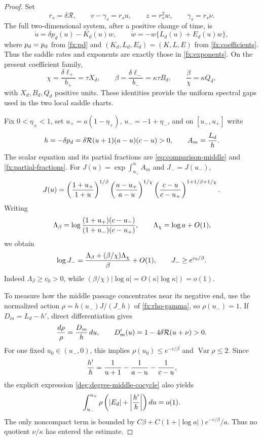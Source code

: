 \begin{proof}
Set
\[
 r_s=\delta\mathcal R,\qquad
 v-\gamma_s=r_su,\qquad z=r_s^2w,\qquad
 \gamma_s=r_s\nu .
\]
The full two-dimensional system, after a positive change of time, is
\begin{equation}
 \dot u=\delta p_d(u)-K_d(u)w,\qquad
 \dot w=-w\{L_d(u)+E_d(u)w\},
 \label{deg:degree-field}
\end{equation}
where \(p_d=p_{\rm d}\) from \eqref{fx:pd} and
\((K_d,L_d,E_d)=(K,L,E)\) from \eqref{fx:coefficients}.
Thus the saddle rates and exponents are exactly those in
\eqref{fx:exponents}. On the present coefficient family,
\begin{equation}
 \chi=\frac{\delta\ell_+}{b_+}=\tau X_d,\qquad
 \beta=\frac{\delta\ell_-}{b_-}=\kappa\tau B_d,\qquad
 \frac{\beta}{\chi}=\kappa Q_d,
 \label{deg:degree-exponents}
\end{equation}
with \(X_d,B_d,Q_d\) positive units.  These identities provide the
uniform spectral gaps used in the two local saddle charts.

Fix \(0<\eta_\pm<1\), set
\(u_+=a(1-\eta_+)\), \(u_-=-1+\eta_-\), and on
\([u_-,u_+]\) write
\[
 h=-\delta p_d
   =\delta\mathcal R(u+1)(a-u)(c-u)>0,\qquad
 A_m={L_d\over h}.
\]
The scalar equation and its partial fractions are
\eqref{eq:comparison-middle} and \eqref{fx:partial-fractions}.
For \(J(u)=\exp\int_{u_+}^uA_m\) and \(J_-=J(u_-)\),
\begin{equation}
 J(u)=
 \left({1+u_+\over1+u}\right)^{1/\beta}
 \left({a-u_+\over a-u}\right)^{1/\chi}
 \left({c-u\over c-u_+}\right)^{1+1/\beta+1/\chi}.
 \label{deg:degree-middle-cocycle}
\end{equation}
Writing
\[
 \Lambda_\beta=
 \log{(1+u_+)(c-u_-)\over(1+u_-)(c-u_+)},
 \qquad \Lambda_\chi=\log a+O(1),
\]
we obtain
\begin{equation}
 \log J_-={\Lambda_\beta+(\beta/\chi)\Lambda_\chi\over\beta}
             +O(1),\qquad J_-\ge e^{c_0/\beta}.
 \label{deg:degree-large-cocycle}
\end{equation}
Indeed \(\Lambda_\beta\ge c_0>0\), while
\((\beta/\chi)|\log a|=O(\kappa|\log\kappa|)=o(1)\).

To measure how the middle passage concentrates near its negative end,
use the normalized action \(\rho=h(u_-)J/(J_-h)\) of
\eqref{fx:rho-gamma}, so
\(\rho(u_-)=1\).
If \(D_m=L_d-h'\), direct differentiation gives
\[
 {d\rho\over\rho}={D_m\over h}\,du,\qquad
 D_m'(u)=1-4\delta\mathcal R(u+\nu)>0.
\]
For one fixed \(u_0\in(u_-,0)\), this implies
\(\rho(u_0)\le e^{-c/\beta}\) and
\(\operatorname {Var}\rho\le2\).  Since
\[
 {h'\over h}={1\over u+1}-{1\over a-u}-{1\over c-u},
\]
the explicit expression \eqref{deg:degree-middle-cocycle} also yields
\begin{equation}
 \int_{u_-}^{u_+}\rho
 \left(|E_d|+\left|{h'\over h}\right|\right)du=o(1).
 \label{deg:degree-small-mass}
\end{equation}
The only noncompact term is bounded by
\(C\beta+C(1+|\log a|)e^{-c/\beta}/a\).  Thus no quotient
\(\nu/\kappa\) has entered the estimate.


\end{proof}
